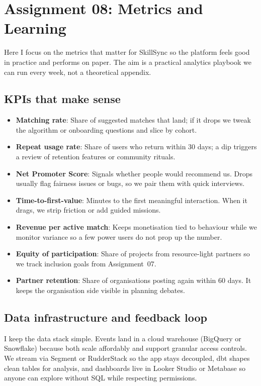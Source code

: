 \section*{Assignment 08: Metrics and Learning}

Here I focus on the metrics that matter for SkillSync so the platform feels good in practice and performs on paper. The aim is a practical analytics playbook we can run every week, not a theoretical appendix.

\subsection*{KPIs that make sense}
\begin{itemize}
    \item \textbf{Matching rate}: Share of suggested matches that land; if it drops we tweak the algorithm or onboarding questions and slice by cohort.
    \item \textbf{Repeat usage rate}: Share of users who return within 30 days; a dip triggers a review of retention features or community rituals.
    \item \textbf{Net Promoter Score}: Signals whether people would recommend us. Drops usually flag fairness issues or bugs, so we pair them with quick interviews.
    \item \textbf{Time-to-first-value}: Minutes to the first meaningful interaction. When it drags, we strip friction or add guided missions.
    \item \textbf{Revenue per active match}: Keeps monetisation tied to behaviour while we monitor variance so a few power users do not prop up the number.
    \item \textbf{Equity of participation}: Share of projects from resource-light partners so we track inclusion goals from Assignment~07.
    \item \textbf{Partner retention}: Share of organisations posting again within 60 days. It keeps the organisation side visible in planning debates.
\end{itemize}

\subsection*{Data infrastructure and feedback loop}
I keep the data stack simple. Events land in a cloud warehouse (BigQuery or Snowflake) because both scale affordably and support granular access controls. We stream via Segment or RudderStack so the app stays decoupled, dbt shapes clean tables for analysis, and dashboards live in Looker Studio or Metabase so anyone can explore without SQL while respecting permissions.

